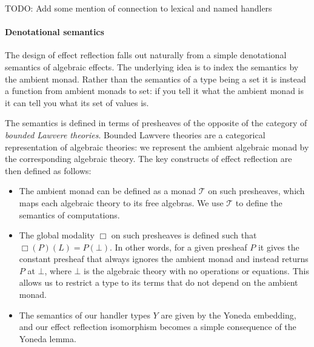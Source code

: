 \documentclass[acmsmall, screen, nonacm]{acmart}
\theoremstyle{definition}
\newcommand{\glob}{\mathop{\Box}}
\newcommand{\initial}{\bot}
\newcommand{\mon}{\mathcal{T}}
\newcommand{\todo}[1]{{\color{red}TODO: #1}}
\begin{document}
\todo{Add some mention of connection to lexical and named handlers}

\paragraph{Denotational semantics} The design of effect reflection falls
out naturally from a simple denotational semantics of algebraic
effects. The underlying idea is to index the semantics by the ambient
monad. Rather than the semantics of a type being a set it is instead a
function from ambient monads to set: if you tell it what the ambient
monad is it can tell you what its set of values is.

The semantics is defined in terms of presheaves of the opposite of the
category of \emph{bounded Lawvere theories}. Bounded Lawvere theories
are a categorical representation of algebraic theories: we represent the
ambient algebraic monad by the corresponding algebraic theory. The key
constructs of effect reflection are then defined as follows:

\begin{itemize}
\item The ambient monad can be defined as a monad $\mon$ on such
  presheaves, which maps each algebraic theory to its free algebras. We use
  $\mon$ to define the semantics of computations.

\item The global modality $\glob$ on such presheaves is defined such
  that $\glob(P)(L) = P(\initial)$. In other words, for a given presheaf
  $P$ it gives the constant presheaf that always ignores the ambient
  monad and instead returns $P$ at $\initial$, where $\initial$ is the
  algebraic theory with no operations or equations. This allows us to
  restrict a type to its terms that do not depend on the ambient monad.

\item The semantics of our handler types $Y$ are given by the Yoneda
  embedding, and our effect reflection isomorphism becomes a simple
  consequence of the Yoneda lemma.
\end{itemize}
\end{document}
